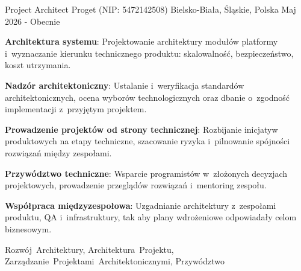 \begin{cventries}
\cventry
{Project Architect} %
{Proget (NIP: 5472142508)} %
{Bielsko-Biała, Śląskie, Polska} %
{Maj 2026 - Obecnie} %
{
  \begin{cvitems} %
    \item {\textbf{Architektura systemu}: Projektowanie architektury modułów platformy i~wyznaczanie kierunku technicznego produktu: skalowalność, bezpieczeństwo, koszt utrzymania.}
    \item {\textbf{Nadzór architektoniczny}: Ustalanie i~weryfikacja standardów architektonicznych, ocena wyborów technologicznych oraz dbanie o~zgodność implementacji z~przyjętym projektem.}
    \item {\textbf{Prowadzenie projektów od strony technicznej}: Rozbijanie inicjatyw produktowych na etapy techniczne, szacowanie ryzyka i~pilnowanie spójności rozwiązań między zespołami.}
    \item {\textbf{Przywództwo techniczne}: Wsparcie programistów w~złożonych decyzjach projektowych, prowadzenie przeglądów rozwiązań i~mentoring zespołu.}
    \item {\textbf{Współpraca międzyzespołowa}: Uzgadnianie architektury z~zespołami produktu, QA i~infrastruktury, tak aby plany wdrożeniowe odpowiadały celom biznesowym.}
  \end{cvitems}
}
{Rozwój~Architektury, Architektura~Projektu, Zarządzanie~Projektami~Architektonicznymi, Przywództwo}


\end{cventries}
